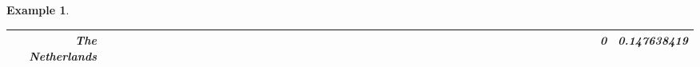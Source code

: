 \documentclass[a4paper,11pt]{report}
\newtheorem{example}[theorem]{Example}
\begin{document}
\begin{example}
\begin{appendices}
\begin{landscape}
\begin{longtable}{r|r|r|r|r|r|r|r|r|r|r|r|r|r|r|r|r|r|r|r|r|r|r|r|r|r|r|r|r|r|r|r|r|r|r|r|r|r|r|r|r|r|r|r|r|r|r|}
\multicolumn{1}{|r|}{\textbf{The Netherlands}}       &                                       &                                       &                                          &                                       &                                       &                                                     &                                        &                                       &                                      &                                       &                                       &                                                &                                       &                                      &                                       &                                       &                                      &                                       &                                       &                                       &                                      &                                     &                                      &                                         &                                     &                                       &                                          &                                      &                                        &                                       &                                      &                                          &                                      &                                        &                                        &                                     &                                      &                                           &                                               &                                      &                                       &                                              &                                      &                                     & 0                                             & 0.147638419                             \\ \hline
\end{longtable}





\end{landscape}
\end{appendices}
\end{example}
\end{document}
